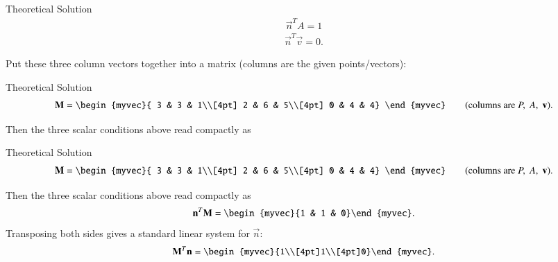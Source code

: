 \documentclass{beamer}
\begin{document}
\begin{frame}{Theoretical Solution}
\begin{align}
\vec{n}^T A = 1
\end{align}
\begin{align}
\vec{n}^T \vec{v} = 0.
\end{align}

Put these three column vectors together into a matrix (columns are the given points/vectors):

\end{frame}
\begin{frame}{Theoretical Solution}
\begin{align}
\vec{M}=\begin{myvec}{
3 & 3 & 1\\[4pt]
2 & 6 & 5\\[4pt]
0 & 4 & 4}
\end{myvec}
\qquad\text{(columns are }P,\;A,\;\vec{v}\text{).}
\end{align}

Then the three scalar conditions above read compactly as
\end{frame}
\begin{frame}{Theoretical Solution}
\begin{align}
\vec{M}=\begin{myvec}{
3 & 3 & 1\\[4pt]
2 & 6 & 5\\[4pt]
0 & 4 & 4}
\end{myvec}
\qquad\text{(columns are }P,\;A,\;\vec{v}\text{).}
\end{align}

Then the three scalar conditions above read compactly as
\begin{align}
\vec{n}^T\vec{M} = \begin{myvec}{1 & 1 & 0}\end{myvec}.
\end{align}
Transposing both sides gives a standard linear system for \(\vec{n}\):
\begin{align}
\vec{M}^T \vec{n} = \begin{myvec}{1\\[4pt]1\\[4pt]0}\end{myvec}.
\end{align}
\end{frame}
\end{document}

